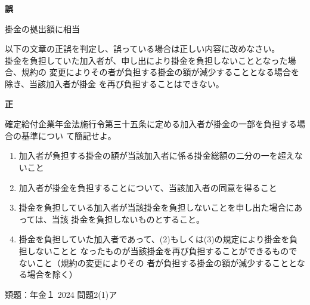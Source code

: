 \begin{answerbox}
  \textbf{誤}

  掛金の拠出額に相当
\end{answerbox}

\begin{truefalse}[年金1 2018 問題2(1)\textcircled{2}]
以下の文章の正誤を判定し、誤っている場合は正しい内容に改めなさい。
\\

掛金を負担していた加入者が、申し出により掛金を負担しないこととなった場合、規約の
変更によりその者が負担する掛金の額が減少することとなる場合を除き、当該加入者が掛金
を再び負担することはできない。
\end{truefalse}

\begin{answerbox}
  \textbf{正}
\end{answerbox}

\begin{shortanswer}[数理人試験 2025 問題4 設問3]
  確定給付企業年金法施行令第三十五条に定める加入者が掛金の一部を負担する場合の基準につい
て簡記せよ。
\end{shortanswer}

\begin{answerbox}
  \begin{enumerate}[(1)]
    \item 加入者が負担する掛金の額が当該加入者に係る掛金総額の二分の一を超えないこと
    \item 加入者が掛金を負担することについて、当該加入者の同意を得ること
    \item 掛金を負担している加入者が当該掛金を負担しないことを申し出た場合にあっては、当該
掛金を負担しないものとすること。
    \item 掛金を負担していた加入者であって、(2)もしくは(3)の規定により掛金を負担しないことと
なったものが当該掛金を再び負担することができるものでないこと（規約の変更によりその
者が負担する掛金の額が減少することとなる場合を除く）
  \end{enumerate}
\end{answerbox}

\begin{explanationbox}
  類題：年金１ 2024 問題2(1)ア
\end{explanationbox}

